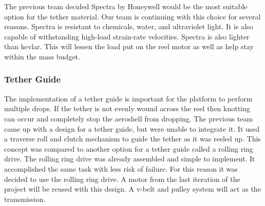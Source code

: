 \begin{table}[H]
\caption{\label{tab:tether_01}Tether materials and properties.}
\centering
\end{table}

The previous team decided Spectra by Honeywell would be the most suitable option for the tether material. Our team is continuing with this choice for several reasons. Spectra is resistant to chemicals, water, and ultraviolet light. It is also capable of withstanding high-load strain-rate velocities. Spectra is also lighter than kevlar. This will lessen the load put on the reel motor as well as help stay within the mass budget.

\subsubsection{Tether Guide}

\indent\indent The implementation of a tether guide is important for the platform to perform multiple drops. If the tether is not evenly wound across the reel then knotting can occur and completely stop the aeroshell from dropping. The previous team came up with a design for a tether guide, but were unable to integrate it. It used a traverse roll and clutch mechanism to guide the tether as it was reeled up. This concept was compared to another option for a tether guide called a rolling ring drive. The rolling ring drive was already assembled and simple to implement. It accomplished the same task with less risk of failure. For this reason it was decided to use the rolling ring drive. A motor from the last iteration of the project will be reused with this design. A v-belt and pulley system will act as the transmission.

